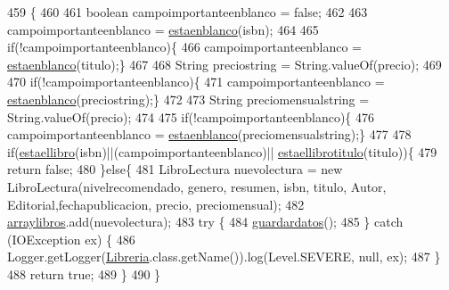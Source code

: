 \begin{DoxyCode}
459                                                                                                            
                     \{
460              
461               \textcolor{keywordtype}{boolean} campoimportanteenblanco = \textcolor{keyword}{false};
462              
463              campoimportanteenblanco = \mbox{\hyperlink{classlibreria_1_1_libreria_afca98a0ea16507ff5cc9bc0dde706abb}{estaenblanco}}(isbn);
464              
465              \textcolor{keywordflow}{if}(!campoimportanteenblanco)\{
466              campoimportanteenblanco = \mbox{\hyperlink{classlibreria_1_1_libreria_afca98a0ea16507ff5cc9bc0dde706abb}{estaenblanco}}(titulo);\}
467              
468              String preciostring = String.valueOf(precio);
469              
470              \textcolor{keywordflow}{if}(!campoimportanteenblanco)\{
471              campoimportanteenblanco = \mbox{\hyperlink{classlibreria_1_1_libreria_afca98a0ea16507ff5cc9bc0dde706abb}{estaenblanco}}(preciostring);\}
472              
473              String preciomensualstring = String.valueOf(precio);
474              
475              \textcolor{keywordflow}{if}(!campoimportanteenblanco)\{
476              campoimportanteenblanco = \mbox{\hyperlink{classlibreria_1_1_libreria_afca98a0ea16507ff5cc9bc0dde706abb}{estaenblanco}}(preciomensualstring);\}
477          
478             \textcolor{keywordflow}{if}(\mbox{\hyperlink{classlibreria_1_1_libreria_a0af77d7fa2b6f3c0a0b218ee9df08ce3}{estaellibro}}(isbn)||(campoimportanteenblanco)||
      \mbox{\hyperlink{classlibreria_1_1_libreria_aec6380fd1bcff89fb0f2d6d4b4584598}{estaellibrotitulo}}(titulo))\{
479                 \textcolor{keywordflow}{return} \textcolor{keyword}{false};
480             \}\textcolor{keywordflow}{else}\{
481                 LibroLectura nuevolectura = \textcolor{keyword}{new} LibroLectura(nivelrecomendado, genero, resumen, isbn, 
      titulo, Autor, Editorial,fechapublicacion, precio, preciomensual);
482                 \mbox{\hyperlink{classlibreria_1_1_libreria_aa55c2bad2db92eb94ea1ba9c6997f47d}{arraylibros}}.add(nuevolectura);
483                   \textcolor{keywordflow}{try} \{
484                       \mbox{\hyperlink{classlibreria_1_1_libreria_abc10249e70e74a9ba55a081bbf23cfcd}{guardardatos}}();
485                   \} \textcolor{keywordflow}{catch} (IOException ex) \{
486                       Logger.getLogger(\mbox{\hyperlink{classlibreria_1_1_libreria_a93220dd4de47ee3b7ef4b2a90701c253}{Libreria}}.class.getName()).log(Level.SEVERE, null, ex);
487                   \}
488                 \textcolor{keywordflow}{return} \textcolor{keyword}{true};
489             \}
490      \}
\end{DoxyCode}
\mbox{\label{classlibreria_1_1_libreria_a4e350d17616aa0869662e953ed4430e9}} 
